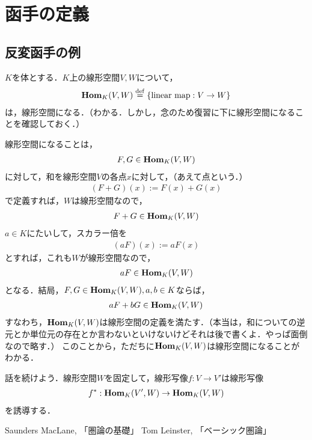 \documentclass[dvipdfmx,12pt]{jsarticle}
\theoremstyle{definition}
\begin{document}
\section{函手の定義}

\subsection{反変函手の例}
$K$を体とする．$K$上の線形空間$V, W$について，
\begin{align*}
{\bold{Hom}}_{K}(V, W) \overset{\mathrm{def}}{=} \{{\rm{linear\ map}}: V \to W\}
\end{align*}
は，線形空間になる．（わかる．しかし，念のため復習に下に線形空間になることを確認しておく．）

線形空間になることは，
\begin{align*}
F, G \in {\bold{Hom}}_{K}(V, W)
\end{align*}
に対して，和を線形空間$V$の各点$x$に対して，（あえて点という．）
\begin{align*}
(F + G)(x) := F(x) + G(x)
\end{align*}
で定義すれば，$W$は線形空間なので，
\begin{align*}
F + G \in {\bold{Hom}}_{K}(V, W)
\end{align*}
$a \in K$にたいして，スカラー倍を
\begin{align*}
(a F)(x) := aF(x)
\end{align*}
とすれば，これも$W$が線形空間なので，
\begin{align*}
aF \in {\bold{Hom}}_{K}(V, W)
\end{align*}
となる．結局，$F,G \in {\bold{Hom}}_{K}(V, W), a,b \in K$ならば，
\begin{align*}
aF + bG \in {\bold{Hom}}_{K}(V, W)
\end{align*}
すなわち，${\bold{Hom}}_{K}(V, W)$は線形空間の定義を満たす．（本当は，和についての逆元とか単位元の存在とか言わないといけないけどそれは後で書くよ．やっぱ面倒なので略す．）
このことから，ただちに${\bold{Hom}}_{K}(V, W)$は線形空間になることがわかる．

話を続けよう．線形空間$W$を固定して，線形写像$f:V \to V'$は線形写像
\begin{align*}
f^{*} :  {\bold{Hom}}_{K}(V', W) \to {\bold{Hom}}_{K}(V, W)
\end{align*}
を誘導する．

\begin{thebibliography}{9}
   Saunders MacLane, 「圏論の基礎」
   Tom Leinster, 「ベーシック圏論」
\end{thebibliography}
\end{document}
